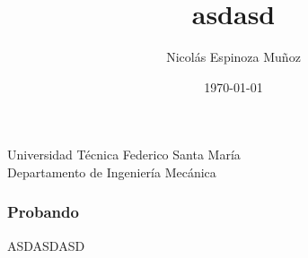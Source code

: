 \documentclass[12pt,letterpaper,landscape]{beamer}
\author{Nicolás Espinoza Muñoz}
\title{asdasd}
\institute{Universidad Técnica Federico Santa María}
\date{\today}
\begin{document}
\frame{\titlepage}
\begin{center}
{\LARGE {Universidad Técnica Federico Santa María}}\\[0.5cm]
{\Large Departamento de Ingeniería Mecánica}\\[2cm]
\end{center}

\begin{frame}
\frametitle{Probando}
ASDASDASD
\end{frame}
\end{document}
